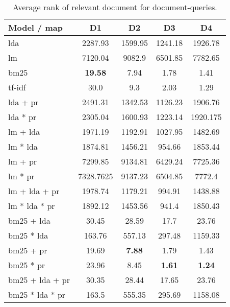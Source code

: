 \begin{table}[h]
	\centering
	\caption{Average rank of relevant document for document-queries.}
	\begin{tabular}{l|c|c|c|c}
		Model / map & D1 & D2 & D3 & D4 \\
		\midrule
		\gls{lda} & 2287.93 & 1599.95 & 1241.18 & 1926.78 \\
		\gls{lm} & 7120.04 & 9082.9 & 6501.85 & 7782.65 \\
		\gls{bm25} & \textbf{19.58} & 7.94 & 1.78 & 1.41 \\
		\gls{tf-idf} & 30.0 & 9.3 & 2.03 & 1.29 \\
		\gls{lda} + \gls{pr} & 2491.31 & 1342.53 & 1126.23 & 1906.76\\
		\gls{lda} * \gls{pr} & 2305.04 & 1600.93 & 1223.14 & 1920.175\\
		\gls{lm} + \gls{lda} & 1971.19 & 1192.91 & 1027.95 & 1482.69 \\
		\gls{lm} * \gls{lda} & 1874.81 & 1456.21 & 954.66 & 1853.44 \\
		\gls{lm} + \gls{pr} & 7299.85 & 9134.81 & 6429.24 & 7725.36 \\
		\gls{lm} * \gls{pr} & 7328.7625 & 9137.23 & 6504.85 & 7772.4\\
		\gls{lm} + \gls{lda} + \gls{pr} & 1978.74 & 1179.21 & 994.91 & 1438.88 \\
		\gls{lm} * \gls{lda} * \gls{pr} & 1892.12 & 1453.56 & 941.4 & 1850.43 \\
		\gls{bm25} + \gls{lda} & 30.45 & 28.59 & 17.7 & 23.76 \\
		\gls{bm25} * \gls{lda} & 163.76 & 557.13 & 297.48 & 1159.33 \\
		\gls{bm25} + \gls{pr} & 19.69 & \textbf{7.88} & 1.79 & 1.43\\
		\gls{bm25} * \gls{pr} & 23.96 & 8.45 & \textbf{1.61} & \textbf{1.24}\\
		\gls{bm25} + \gls{lda} + \gls{pr} & 30.35 & 28.44 & 17.65 & 23.76\\
		\gls{bm25} * \gls{lda} * \gls{pr} & 163.5 & 555.35 & 295.69 & 1158.08\\
	\end{tabular}
	
	\label{tab:hit_results}
\end{table}

